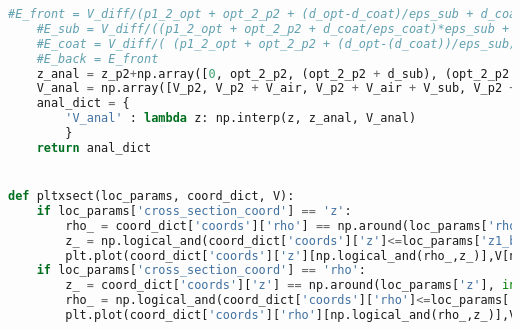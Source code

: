 \begin{lstlisting}[frame=single, language=Python]
    #E_front = V_diff/(p1_2_opt + opt_2_p2 + (d_opt-d_coat)/eps_sub + d_coat/eps_coat)
    #E_sub = V_diff/((p1_2_opt + opt_2_p2 + d_coat/eps_coat)*eps_sub + (d_opt-d_coat))
    #E_coat = V_diff/( (p1_2_opt + opt_2_p2 + (d_opt-(d_coat))/eps_sub)*eps_coat + d_coat)
    #E_back = E_front
    z_anal = z_p2+np.array([0, opt_2_p2, (opt_2_p2 + d_sub), (opt_2_p2 + d_sub + d_coat), (opt_2_p2 + d_sub + d_coat + opt_2_p2)])
    V_anal = np.array([V_p2, V_p2 + V_air, V_p2 + V_air + V_sub, V_p2 + V_air + V_sub + V_coat, V_p1])
    anal_dict = {
        'V_anal' : lambda z: np.interp(z, z_anal, V_anal)
        }
    return anal_dict


def pltxsect(loc_params, coord_dict, V): 
    if loc_params['cross_section_coord'] == 'z':
        rho_ = coord_dict['coords']['rho'] == np.around(loc_params['rho'], int(abs(np.log10(coord_dict['coords']['rho'][1]))))
        z_ = np.logical_and(coord_dict['coords']['z']<=loc_params['z1_bound'], coord_dict['coords']['z']>=loc_params['z2_bound'])
        plt.plot(coord_dict['coords']['z'][np.logical_and(rho_,z_)],V[np.logical_and(rho_, z_)])
    if loc_params['cross_section_coord'] == 'rho':
        z_ = coord_dict['coords']['z'] == np.around(loc_params['z'], int(abs(np.log10(coord_dict['coords']['z'][1]))))
        rho_ = np.logical_and(coord_dict['coords']['rho']<=loc_params['rho2_bound'], coord_dict['coords']['rho']>=loc_params['rho1_bound'])
        plt.plot(coord_dict['coords']['rho'][np.logical_and(rho_,z_)],V[np.logical_and(rho_, z_)])
\end{lstlisting}
